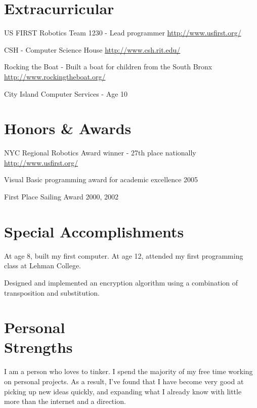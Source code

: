 \documentclass[a4paper,margin,line]{resume}
\newcommand{\rurl}[1]{\hfill {\footnotesize \url{#1}}}
\begin{document}
\begin{resume}
\section{\mysidestyle Extracurricular}
	\begin{asparablank}
		\item US FIRST Robotics Team 1230 - {\small Lead programmer} \rurl{http://www.usfirst.org/}
		\item CSH - {\small Computer Science House} \rurl{http://www.csh.rit.edu/}
		\item Rocking the Boat - {\small Built a boat for children from the South
		Bronx} \rurl{http://www.rockingtheboat.org/}
		\item City Island Computer Services - {\small Age 10}
	\end{asparablank}

\section{\mysidestyle Honors \& Awards}
	\begin{asparablank}
		\item NYC Regional Robotics Award winner - {\small 27th place nationally}
		\rurl{http://www.usfirst.org/}
		\item Visual Basic programming award for academic excellence 2005
		\item First Place Sailing Award 2000, 2002
	\end{asparablank}

\section{\mysidestyle Special Accomplishments}
	\begin{asparablank}
		\item At age 8, built my first computer. At age 12, attended my first
		programming class at Lehman College.
		\item Designed and implemented an encryption algorithm using a
		combination of transposition and substitution.
	\end{asparablank}

\section{\mysidestyle Personal \\ Strengths}
	I am a person who loves to tinker. I spend the majority of my free time
	working on personal projects. As a result, I've found that I have become very
	good at picking up new ideas quickly, and expanding what I already know with
	little more than the internet and a direction.

\end{resume}
\pagebreak[4] %

\end{document}
